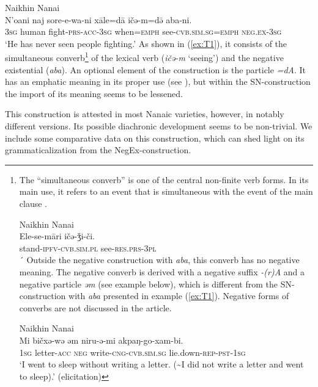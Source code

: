 \documentclass[output=paper,colorlinks,citecolor=brown]{langscibook}
\begin{document}
\ea Naikhin Nanai \label{ex:T1}\\
	\gll N’oani	naj	sore-e-wa-ni	xāle=dā	ičə-m=də̄	aba-ni.\\
	\textsc{3sg}	human	fight-\textsc{prs-acc-3sg}	when=\textsc{emph}	see-\textsc{cvb.sim.sg}=\textsc{emph}	\textsc{neg.ex-3sg}\\
	\glt `He has never seen people fighting.' \citep[154, text]{avrorin1986a}
\z
As shown in (\ref{ex:T1}), it consists of the simultaneous converb\footnote{The
    “simultaneous converb” is one of the central non-finite verb forms. In its main use, it refers to an event that is simultaneous with the event of the main clause .

    \ea Naikhin Nanai \label{ex:T-i}\\
	\gll Ele-se-māri				ičə-ǯi-či.\\
	stand-\textsc{ipfv-cvb.sim.pl}	see-\textsc{res.prs-3pl}\\
    \z
´
    Outside the negative construction with \textit{aba}, this converb has no negative meaning. The negative converb is derived with a negative suffix\textit{ -(r)A} and a negative particle \textit{əm} (see example  below), which is different from the SN-construction with \textit{aba} presented in example (\ref{ex:T1}). Negative forms of converbs are not discussed in the article.

    \ea Naikhin Nanai \label{ex:T-ii}\\
	\gll Mi		bičxə-wə	əm		niru-ə-mi						akpaŋ-go-xam-bi.\\
	\textsc{1sg}	letter-\textsc{acc}	\textsc{neg}	write-\textsc{cng-cvb.sim.sg}	lie.down-\textsc{rep-pst-1sg}\\
	\glt `I went to sleep without writing a letter. (\sim I did not write a letter and went to sleep).' (elicitation)
    \zlast
}
of the lexical verb (\textit{ičə-m} ‘seeing’) and the negative existential (\textit{aba}). An optional element of the construction is the particle \textit{=dA}. It has an emphatic meaning in its proper use (see \citealp[264]{avrorin1961a}), but within the SN-construction the import of its meaning seems to be lessened.


This construction is attested in most Nanaic varieties, however, in notably different versions. Its possible diachronic development seems to be non-trivial. We include some comparative data on this construction, which can shed light on its grammaticalization from the NegEx-construction.
\end{document}
